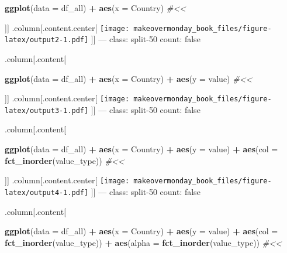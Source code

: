 \documentclass[]{book}
\newenvironment{Shaded}{\begin{snugshade}}{\end{snugshade}}
\newcommand{\KeywordTok}[1]{\textcolor[rgb]{0.13,0.29,0.53}{\textbf{#1}}}
\newcommand{\DataTypeTok}[1]{\textcolor[rgb]{0.13,0.29,0.53}{#1}}
\newcommand{\StringTok}[1]{\textcolor[rgb]{0.31,0.60,0.02}{#1}}
\newcommand{\CommentTok}[1]{\textcolor[rgb]{0.56,0.35,0.01}{\textit{#1}}}
\newcommand{\OperatorTok}[1]{\textcolor[rgb]{0.81,0.36,0.00}{\textbf{#1}}}
\newcommand{\NormalTok}[1]{#1}
\theoremstyle{definition}
\theoremstyle{definition}
\theoremstyle{definition}
\theoremstyle{remark}
\begin{document}
\begin{Shaded}
\begin{Highlighting}[]
\KeywordTok{ggplot}\NormalTok{(}\DataTypeTok{data =}\NormalTok{ df_all) }\OperatorTok{+}
\StringTok{  }\KeywordTok{aes}\NormalTok{(}\DataTypeTok{x =}\NormalTok{ Country)  }\CommentTok{#<<}
\end{Highlighting}
\end{Shaded}

{]}{]} .column{[}.content.center{[}
\texttt{[image: makeovermonday\_book\_files/figure-latex/output2-1.pdf]}
{]}{]} --- class: split-50 count: false

.column{[}.content{[}

\begin{Shaded}
\begin{Highlighting}[]
\KeywordTok{ggplot}\NormalTok{(}\DataTypeTok{data =}\NormalTok{ df_all) }\OperatorTok{+}
\StringTok{  }\KeywordTok{aes}\NormalTok{(}\DataTypeTok{x =}\NormalTok{ Country) }\OperatorTok{+}
\StringTok{  }\KeywordTok{aes}\NormalTok{(}\DataTypeTok{y =}\NormalTok{ value)  }\CommentTok{#<<}
\end{Highlighting}
\end{Shaded}

{]}{]} .column{[}.content.center{[}
\texttt{[image: makeovermonday\_book\_files/figure-latex/output3-1.pdf]}
{]}{]} --- class: split-50 count: false

.column{[}.content{[}

\begin{Shaded}
\begin{Highlighting}[]
\KeywordTok{ggplot}\NormalTok{(}\DataTypeTok{data =}\NormalTok{ df_all) }\OperatorTok{+}
\StringTok{  }\KeywordTok{aes}\NormalTok{(}\DataTypeTok{x =}\NormalTok{ Country) }\OperatorTok{+}
\StringTok{  }\KeywordTok{aes}\NormalTok{(}\DataTypeTok{y =}\NormalTok{ value) }\OperatorTok{+}
\StringTok{  }\KeywordTok{aes}\NormalTok{(}\DataTypeTok{col =} \KeywordTok{fct_inorder}\NormalTok{(value_type))  }\CommentTok{#<<}
\end{Highlighting}
\end{Shaded}

{]}{]} .column{[}.content.center{[}
\texttt{[image: makeovermonday\_book\_files/figure-latex/output4-1.pdf]}
{]}{]} --- class: split-50 count: false

.column{[}.content{[}

\begin{Shaded}
\begin{Highlighting}[]
\KeywordTok{ggplot}\NormalTok{(}\DataTypeTok{data =}\NormalTok{ df_all) }\OperatorTok{+}
\StringTok{  }\KeywordTok{aes}\NormalTok{(}\DataTypeTok{x =}\NormalTok{ Country) }\OperatorTok{+}
\StringTok{  }\KeywordTok{aes}\NormalTok{(}\DataTypeTok{y =}\NormalTok{ value) }\OperatorTok{+}
\StringTok{  }\KeywordTok{aes}\NormalTok{(}\DataTypeTok{col =} \KeywordTok{fct_inorder}\NormalTok{(value_type)) }\OperatorTok{+}
\StringTok{  }\KeywordTok{aes}\NormalTok{(}\DataTypeTok{alpha =} \KeywordTok{fct_inorder}\NormalTok{(value_type))  }\CommentTok{#<<}
\end{Highlighting}
\end{Shaded}
\end{document}
